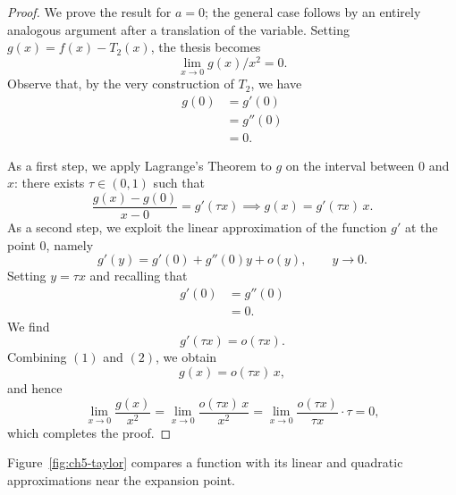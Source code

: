 \begin{proof}
We prove the result for $a = 0$; the general case follows by an entirely analogous argument after a translation of the variable. Setting $g(x) = f(x) - T_2(x)$, the thesis becomes
\[
\lim_{x \to 0} g(x)/x^2 = 0.
\]
Observe that, by the very construction of $T_2$, we have
\[
\begin{aligned}
g(0) &= g'(0) \\
&= g''(0) \\
&= 0.
\end{aligned}
\]

As a first step, we apply Lagrange's Theorem to $g$ on the interval between $0$ and $x$: there exists $\tau \in (0,1)$ such that
\begin{equation*}
\frac{g(x) - g(0)}{x - 0} = g'(\tau x) \implies g(x) = g'(\tau x) \, x. \tag{1}
\end{equation*}
As a second step, we exploit the linear approximation of the function $g'$ at the point $0$, namely
\[
g'(y) = g'(0) + g''(0) y + o(y), \qquad y \to 0.
\]
Setting $y = \tau x$ and recalling that
\[
\begin{aligned}
g'(0) &= g''(0) \\
&= 0.
\end{aligned}
\]
We find
\begin{equation*}
g'(\tau x) = o(\tau x). \tag{2}
\end{equation*}
Combining $(1)$ and $(2)$, we obtain
\[
g(x) = o(\tau x) \, x,
\] and hence
\[
\lim_{x \to 0} \frac{g(x)}{x^2} = \lim_{x \to 0} \frac{o(\tau x) \, x}{x^2} = \lim_{x \to 0} \frac{o(\tau x)}{\tau x} \cdot \tau = 0,
\]
which completes the proof.
\end{proof}

Figure~\ref{fig:ch5-taylor} compares a function with its linear and quadratic approximations near the expansion point.

